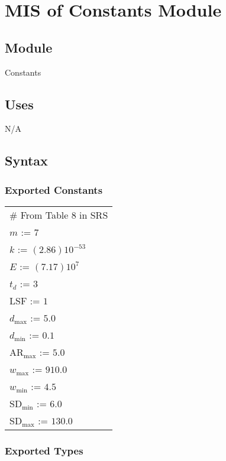 \documentclass[12pt, titlepage]{article}
\begin{document}
\newpage


\section{MIS of Constants Module} \label{Constants}

\subsection{Module}

Constants

\subsection {Uses}

N/A

\subsection {Syntax}

\subsubsection {Exported Constants}

\renewcommand{\arraystretch}{1.2}
\begin{longtable*}[l]{l} 
\# From Table 8 in SRS\\
$m$ := 7\\
$k$ := $\left(2.86\right)10^{-53}$\\
$E$ := $\left(7.17\right)10^{7}$\\
${t_{d}}$ := $3$\\
LSF := $1$\\
${d_{\text{max}}}$ := $5.0$\\
${d_{\text{min}}}$ := $0.1$\\
${\text{AR}_{\text{max}}}$ := $5.0$\\
${w_{\text{max}}}$ := $910.0$\\
${w_{\text{min}}}$ := $4.5$\\
${\text{SD}_{\text{min}}}$ := $6.0$\\
${\text{SD}_{\text{max}}}$ := $130.0$\\
\end{longtable*}

\subsubsection {Exported Types}
\end{document}

